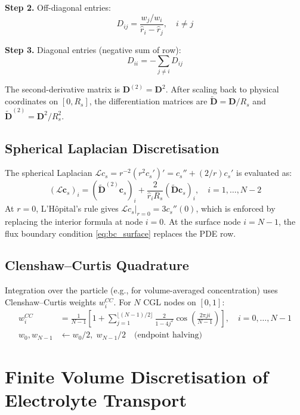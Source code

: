 \textbf{Step 2.} Off-diagonal entries:
\begin{equation}
  D_{ij} = \frac{w_j/w_i}{\hat{r}_i - \hat{r}_j}, \quad i \neq j
  \label{eq:D_offdiag}
\end{equation}

\textbf{Step 3.} Diagonal entries (negative sum of row):
\begin{equation}
  D_{ii} = -\sum_{j \neq i} D_{ij}
  \label{eq:D_diag}
\end{equation}

The second-derivative matrix is $\mathbf{D}^{(2)} = \mathbf{D}^2$. After scaling back to physical coordinates on $[0, R_s]$, the differentiation matrices are $\tilde{\mathbf{D}} = \mathbf{D}/R_s$ and $\tilde{\mathbf{D}}^{(2)} = \mathbf{D}^2/R_s^2$.

\subsection{Spherical Laplacian Discretisation}

The spherical Laplacian $\mathcal{L}c_s = r^{-2}(r^2 c_s')' = c_s'' + (2/r)c_s'$ is evaluated as:
\begin{equation}
  (\mathcal{L}\mathbf{c}_s)_i = (\tilde{\mathbf{D}}^{(2)}\mathbf{c}_s)_i + \frac{2}{\hat{r}_i R_s}(\tilde{\mathbf{D}}\mathbf{c}_s)_i, \quad i = 1,\ldots,N-2
  \label{eq:spherical_lap}
\end{equation}
At $r=0$, L'Hôpital's rule gives $\mathcal{L}c_s|_{r=0} = 3 c_s''(0)$, which is enforced by replacing the interior formula at node $i=0$. At the surface node $i = N-1$, the flux boundary condition \cref{eq:bc_surface} replaces the PDE row.

\subsection{Clenshaw--Curtis Quadrature}

Integration over the particle (e.g., for volume-averaged concentration) uses Clenshaw--Curtis weights $w_i^{CC}$. For $N$ CGL nodes on $[0,1]$:
\begin{align}
  w_i^{CC} &= \frac{1}{N-1}\left[1 + \sum_{j=1}^{\lfloor(N-1)/2\rfloor} \frac{2}{1-4j^2}\cos\!\left(\frac{2\pi j i}{N-1}\right)\right], \quad i = 0, \ldots, N-1 \label{eq:cc_weights}\\
  w_0, w_{N-1} &\leftarrow w_0/2, \; w_{N-1}/2 \quad\text{(endpoint halving)}
\end{align}

\section{Finite Volume Discretisation of Electrolyte Transport}
\label{sec:fvm_electrolyte}

